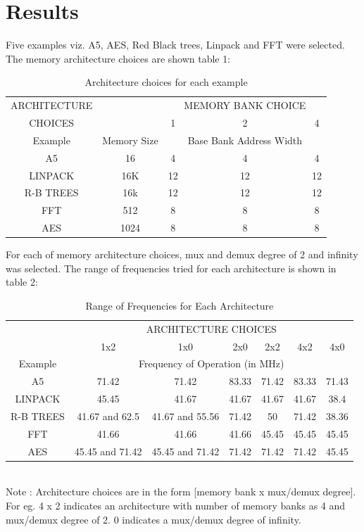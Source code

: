 \documentclass[a4paper, twoside]{article}      %
\begin{document}
\section{Results}
Five examples viz. A5, AES, Red Black trees, Linpack and FFT were selected. 
The memory architecture choices are shown table 1:


\begin{table}[t]

\caption{Architecture choices for each example}
\begin{center}
{\begin{tabular}{c  c | c  c  c}
\hline
ARCHITECTURE && \multicolumn{3}{c}{MEMORY BANK CHOICE} \\  
CHOICES && 1& 2& 4 \\ [3ex] 
\hline
Example& Memory Size &&Base Bank Address Width \\ [1ex]
\hline 
A5& 16& 4& 4& 4\\[1ex]
LINPACK& 16K& 12& 12& 12\\[1ex]
R-B TREES& 16k& 12& 12& 12\\[1ex]
FFT& 512& 8& 8& 8\\[1ex]
AES& 1024& 8& 8& 8\\[1ex]
\hline

\end{tabular}}
\label{diffstruc}
\end{center}	
\end{table}

For each of memory architecture choices, mux and demux degree of 2 and infinity was selected.
The range of frequencies tried for each architecture is shown in table 2:


\begin{table}[t]
\caption{Range of Frequencies for Each Architecture}
\begin{center}
{\begin{tabular}{c | c  c  c  c  c  c}
\hline
 & \multicolumn{6}{c}{ARCHITECTURE CHOICES} \\[1ex]
 &1x2 &1x0 &2x0 &2x2 &4x2 &4x0 \\ [1ex]
\hline
Example& \multicolumn{6}{c}{Frequency of Operation (in MHz)} \\ [1ex]
\hline
A5& 71.42& 71.42& 83.33& 71.42& 83.33& 71.43\\[1ex]
LINPACK& 45.45& 41.67& 41.67& 41.67& 41.67& 38.4\\[1ex]
R-B TREES& 41.67 and 62.5 & 41.67 and 55.56& 71.42& 50& 71.42& 38.36\\[1ex]
FFT& 41.66& 41.66& 41.66& 45.45& 45.45& 45.45\\[1ex]
AES& 45.45 and 71.42& 45.45 and 71.42& 71.42& 71.42& 71.42& 45.45\\[1ex]
\hline

\end{tabular}}
\\[1ex]
Note : Architecture choices are in the form [memory bank x mux/demux degree]. For eg. 4 x 2 indicates an architecture with number of memory banks as 4 and mux/demux degree of 2. 0 indicates a mux/demux degree of infinity.
\label{diffstruc}
\end{center}
\end{table}
\end{document}
